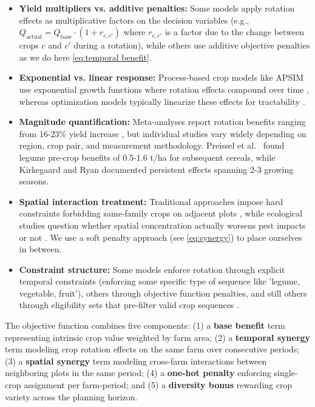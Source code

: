 \documentclass{oqireport}
\begin{document}
\begin{itemize}
    \item \textbf{Yield multipliers vs. additive penalties:} Some models apply rotation effects as multiplicative factors on the decision variables (e.g., $Q_{\text{actual}} = Q_{\text{base}} \cdot (1 + r_{c,c'})$ where $r_{c,c'}$ is a factor due to the change between crops $c$ and $c'$ during a rotation), while others use additive objective penalties as we do here \cref{eq:temporal benefit}\cite{cai2011dynamic, haneveld2005crop}.
    
    \item \textbf{Exponential vs. linear response:} Process-based crop models like APSIM use exponential growth functions where rotation effects compound over time \cite{keating2003overview}, whereas optimization models typically linearize these effects for tractability \cite{liang2023designing}.
    
    \item \textbf{Magnitude quantification:} Meta-analyses report rotation benefits ranging from 16-23\% yield increase \cite{mudare2025crop, zhao2022global}, but individual studies vary widely depending on region, crop pair, and measurement methodology. Preissel et al.\ \cite{preissel2015magnitude} found legume pre-crop benefits of 0.5-1.6 t/ha for subsequent cereals, while Kirkegaard and Ryan \cite{kirkegaard2014magnitude} documented persistent effects spanning 2-3 growing seasons.
    
    \item \textbf{Spatial interaction treatment:} Traditional approaches impose hard constraints forbidding same-family crops on adjacent plots \cite{ballot2023first}, while ecological studies question whether spatial concentration actually worsens pest impacts or not \cite{karp2018crop, root1973organization}. We use a soft penalty approach (see \cref{eq:synergy}) to place ourselves in between.
    
    \item \textbf{Constraint structure:} Some models enforce rotation through explicit temporal constraints (enforcing some specific type of sequence like 'legume, vegetable, fruit'), others through objective function penalties, and still others through eligibility sets that pre-filter valid crop sequences \cite{haneveld2005crop}.
\end{itemize}


The objective function combines five components: (1) a \textbf{base benefit} term representing intrinsic crop value weighted by farm area; (2) a \textbf{temporal synergy} term modeling crop rotation effects on the same farm over consecutive periods; (3) a \textbf{spatial synergy} term modeling cross-farm interactions between neighboring plots in the same period; (4) a \textbf{one-hot penalty} enforcing single-crop assignment per farm-period; and (5) a \textbf{diversity bonus} rewarding crop variety across the planning horizon.
\end{document}
